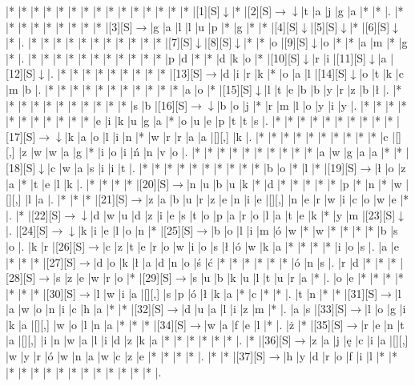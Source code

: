 \documentclass[11pt]{article}
\newcommand\drarr{$\rightarrow \!\!\!\!\! \downarrow$}
\newcommand\rarr{$\rightarrow$}
\newcommand\darr{$\downarrow$}
\begin{document}
\newpage%

\noindent\begin{Puzzle}{24}{24}|*	|*	|*	|*	|*	|*	|*	|*	|*	|*	|*	|*	|*	|*	|*	|[1][S]\darr	|*	|[2][S]\drarr	|t	|a	|j	|g	|a	|*	|*	|.
|*	|*	|*	|*	|*	|*	|*	|*	|*	|[3][S]\rarr	|g	|a	|l	|l	|u	|p	|*	|g	|*	|*	|[4][S]\darr	|[5][S]\darr	|*	|[6][S]\darr	|*	|.
|*	|*	|*	|*	|*	|*	|*	|*	|*	|*	|*	|[7][S]\darr	|[8][S]\darr	|*	|*	|o	|[9][S]\darr	|o	|*	|*	|a	|m	|*	|g	|*	|.
|*	|*	|*	|*	|*	|*	|*	|*	|*	|*	|*	|p	|d	|*	|*	|d	|k	|o	|*	|[10][S]\darr	|r	|i	|[11][S]\darr	|a	|[12][S]\darr	|.
|*	|*	|*	|*	|*	|*	|*	|*	|*	|[13][S]\rarr	|d	|i	|r	|k	|*	|o	|a	|l	|[14][S]\darr	|o	|t	|k	|c	|m	|b	|.
|*	|*	|*	|*	|*	|*	|*	|*	|*	|*	|*	|a	|o	|*	|[15][S]\darr	|l	|t	|e	|b	|b	|y	|r	|z	|b	|ł	|.
|*	|*	|*	|*	|*	|*	|*	|*	|*	|*	|*	|s	|b	|[16][S]\drarr	|b	|o	|j	|*	|r	|m	|l	|o	|y	|i	|y	|.
|*	|*	|*	|*	|*	|*	|*	|*	|*	|*	|*	|e	|i	|k	|u	|g	|a	|*	|o	|u	|e	|p	|t	|t	|s	|.
|*	|*	|*	|*	|*	|*	|*	|*	|*	|*	|[17][S]\drarr	|k	|a	|o	|l	|i	|n	|*	|w	|r	|r	|a	|a	|[][,]{ }	|k	|.
|*	|*	|*	|*	|*	|*	|*	|*	|*	|*	|c	|[][,]{ }	|z	|w	|w	|a	|g	|*	|i	|o	|i	|ń	|n	|v	|o	|.
|*	|*	|*	|*	|*	|*	|*	|*	|*	|*	|a	|w	|g	|a	|a	|*	|*	|[18][S]\darr	|c	|w	|a	|s	|i	|i	|t	|.
|*	|*	|*	|*	|*	|*	|*	|*	|*	|*	|b	|o	|*	|l	|*	|[19][S]\rarr	|ł	|o	|z	|a	|*	|t	|e	|l	|k	|.
|*	|*	|*	|*	|[20][S]\rarr	|n	|u	|b	|u	|k	|*	|d	|*	|*	|*	|*	|*	|p	|*	|n	|*	|w	|[][,]{ }	|l	|a	|.
|*	|*	|*	|[21][S]\rarr	|z	|a	|b	|u	|r	|z	|e	|n	|i	|e	|[][,]{ }	|n	|e	|r	|w	|i	|c	|o	|w	|e	|*	|.
|*	|[22][S]\drarr	|d	|w	|u	|d	|z	|i	|e	|s	|t	|o	|p	|a	|r	|o	|l	|a	|t	|e	|k	|*	|y	|m	|[23][S]\darr	|.
|[24][S]\drarr	|k	|i	|e	|l	|o	|n	|*	|[25][S]\rarr	|b	|o	|l	|i	|m	|ó	|w	|*	|w	|*	|*	|*	|*	|b	|s	|o	|.
|k	|r	|[26][S]\rarr	|c	|z	|t	|e	|r	|o	|w	|i	|o	|s	|ł	|ó	|w	|k	|a	|*	|*	|*	|*	|i	|o	|s	|.
|a	|e	|*	|*	|*	|[27][S]\rarr	|d	|o	|k	|ł	|a	|d	|n	|o	|ś	|ć	|*	|*	|*	|*	|*	|*	|ó	|n	|s	|.
|r	|d	|*	|*	|*	|[28][S]\rarr	|s	|z	|e	|w	|r	|o	|*	|[29][S]\rarr	|s	|u	|b	|k	|u	|l	|t	|u	|r	|a	|*	|.
|o	|e	|*	|*	|*	|*	|*	|*	|*	|[30][S]\rarr	|l	|w	|i	|a	|[][,]{ }	|s	|p	|ó	|ł	|k	|a	|*	|c	|*	|*	|.
|t	|n	|*	|*	|[31][S]\rarr	|l	|a	|w	|o	|n	|i	|c	|h	|a	|*	|*	|[32][S]\rarr	|d	|u	|a	|l	|i	|z	|m	|*	|.
|a	|s	|[33][S]\rarr	|l	|o	|g	|i	|k	|a	|[][,]{ }	|w	|o	|l	|n	|a	|*	|*	|*	|[34][S]\rarr	|w	|a	|f	|e	|l	|*	|.
|ż	|*	|[35][S]\rarr	|r	|e	|n	|t	|a	|[][,]{ }	|i	|n	|w	|a	|l	|i	|d	|z	|k	|a	|*	|*	|*	|*	|*	|*	|.
|*	|[36][S]\rarr	|z	|a	|j	|ę	|c	|i	|a	|[][,]{ }	|w	|y	|r	|ó	|w	|n	|a	|w	|c	|z	|e	|*	|*	|*	|*	|.
|*	|*	|[37][S]\rarr	|h	|y	|d	|r	|o	|f	|i	|l	|*	|*	|*	|*	|*	|*	|*	|*	|*	|*	|*	|*	|*	|*	|.\end{Puzzle}
\end{document}
